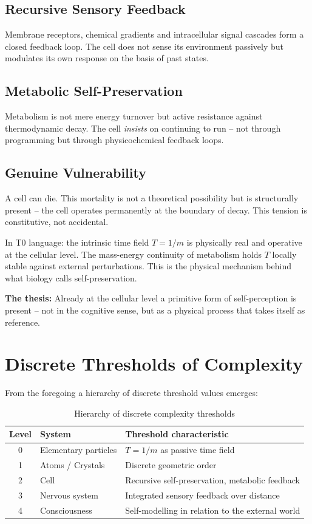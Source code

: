 	\subsection{Recursive Sensory Feedback}
	Membrane receptors, chemical gradients and intracellular signal cascades form a closed feedback loop. The cell does not sense its environment passively but modulates its own response on the basis of past states.
	
	\subsection{Metabolic Self-Preservation}
	Metabolism is not mere energy turnover but active resistance against thermodynamic decay. The cell \textit{insists} on continuing to run -- not through programming but through physicochemical feedback loops.
	
	\subsection{Genuine Vulnerability}
	A cell can die. This mortality is not a theoretical possibility but is structurally present -- the cell operates permanently at the boundary of decay. This tension is constitutive, not accidental.
	
	In T0 language: the intrinsic time field $T = 1/m$ is physically real and operative at the cellular level. The mass-energy continuity of metabolism holds $T$ locally stable against external perturbations. This is the physical mechanism behind what biology calls self-preservation.
	
	\textbf{The thesis:} Already at the cellular level a primitive form of self-perception is present -- not in the cognitive sense, but as a physical process that takes itself as reference.
	
	\section{Discrete Thresholds of Complexity}
	
	From the foregoing a hierarchy of discrete threshold values emerges:
	
	\begin{table}[h]
		\centering
		\begin{tabular}{|c|l|p{8cm}|}
			\hline
			\textbf{Level} & \textbf{System} & \textbf{Threshold characteristic} \\
			\hline
			0 & Elementary particles & $T = 1/m$ as passive time field \\
			1 & Atoms / Crystals & Discrete geometric order \\
			2 & Cell & Recursive self-preservation, metabolic feedback \\
			3 & Nervous system & Integrated sensory feedback over distance \\
			4 & Consciousness & Self-modelling in relation to the external world \\
			\hline
		\end{tabular}
		\caption{Hierarchy of discrete complexity thresholds}
	\end{table}
	
